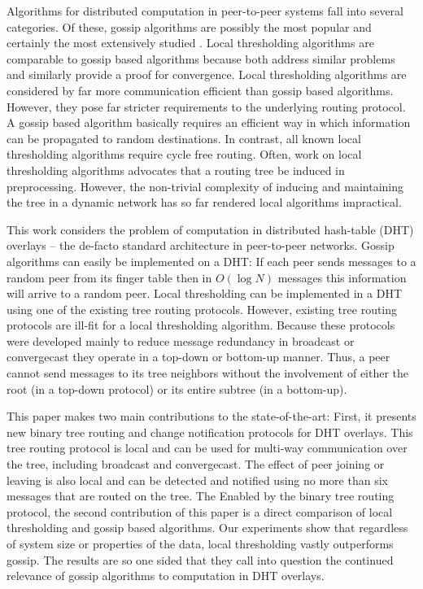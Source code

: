 \documentclass[12pt,english,journal]{elsarticle}
\numberwithin{equation}{section}
\numberwithin{figure}{section}
\theoremstyle{plain}
\theoremstyle{plain}
\begin{document}
Algorithms for distributed computation in peer-to-peer systems fall
into several categories. Of these, gossip algorithms are possibly
the most popular and certainly the most extensively studied \citep{KempeGossip,gossipBoyd,Gossip,gossipSpeedup,GossipVoting,gossipKalman,gossipKalman1,gossipSL,dynamicGossip}.
Local thresholding algorithms \citep{MajorityRulej,localRanking,l2,p2pDT,p2pEigen}
are comparable to gossip based algorithms because both address similar
problems and similarly provide a proof for convergence. Local thresholding
algorithms are considered by far more communication efficient than
gossip based algorithms. However, they pose far stricter requirements
to the underlying routing protocol. A gossip based algorithm basically
requires an efficient way in which information can be propagated to
random destinations. In contrast, all known local thresholding algorithms
require cycle free routing. Often, work on local thresholding algorithms
advocates that a routing tree be induced in preprocessing. However,
the non-trivial complexity of inducing and maintaining the tree in
a dynamic network has so far rendered local algorithms impractical.

This work considers the problem of computation in distributed hash-table
(DHT) overlays -- the de-facto standard architecture in peer-to-peer
networks. Gossip algorithms can easily be implemented on a DHT: If
each peer sends messages to a random peer from its finger table then
in $O\left(\log N\right)$ messages this  information will arrive
to a random peer. Local thresholding can be implemented in a DHT using
one of the existing tree routing protocols. However, existing tree
routing protocols \citep{DHTTree1,DHTTree2,dhttreeJ} are ill-fit
for a local thresholding algorithm. Because these protocols were developed
mainly to reduce message redundancy in broadcast or convergecast they
operate in a top-down or bottom-up manner. Thus, a peer cannot send
messages to its tree neighbors without the involvement of either the
root (in a top-down protocol) or its entire subtree (in a bottom-up). 

This paper makes two main contributions to the state-of-the-art: First,
it presents new binary tree routing and change notification protocols
for DHT overlays. This tree routing protocol is local and can be used
for multi-way communication over the tree, including broadcast and
convergecast. The effect of peer joining or leaving is also local
and can be detected and notified using no more than six messages that
are routed on the tree. The Enabled by the binary tree routing protocol,
the second contribution of this paper is a direct comparison of local
thresholding and gossip based algorithms. Our experiments show that
regardless of system size or properties of the data, local thresholding
vastly outperforms gossip. The results are so one sided that they
call into question the continued relevance of gossip algorithms to
computation in DHT overlays.
\end{document}
